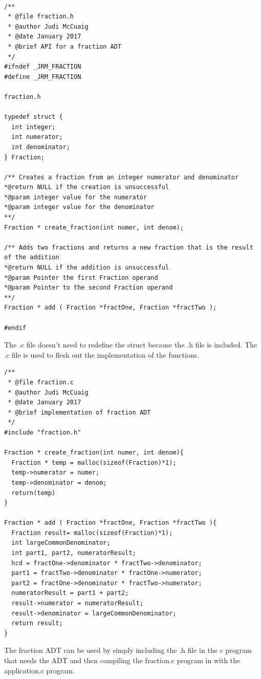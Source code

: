 \begin{lstlisting}

/**
 * @file fraction.h
 * @author Judi McCuaig
 * @date January 2017
 * @brief API for a fraction ADT
 */
#ifndef _JRM_FRACTION
#define _JRM_FRACTION

fraction.h

typedef struct {
  int integer;
  int numerator;
  int denominator;
} Fraction;

/** Creates a fraction from an integer numerator and denominator
*@return NULL if the creation is unsuccessful
*@param integer value for the numerator
*@param integer value for the denominator
**/
Fraction * create_fraction(int numer, int denom);

/** Adds two fractions and returns a new fraction that is the result of the addition
*@return NULL if the addition is unsuccessful
*@param Pointer the first Fraction operand
*@param Pointer to the second Fraction operand
**/
Fraction * add ( Fraction *fractOne, Fraction *fractTwo );

#endif

\end{lstlisting}

The .c file doesn't need to redefine the struct because the .h file is included.  The .c file is used to flesh out the implementation of the functions.

\begin{lstlisting}
/**
 * @file fraction.c
 * @author Judi McCuaig
 * @date January 2017
 * @brief implementation of fraction ADT
 */
#include "fraction.h"

Fraction * create_fraction(int numer, int denom){
  Fraction * temp = malloc(sizeof(Fraction)*1);
  temp->numerator = numer;
  temp->denominator = denom;
  return(temp)
}

Fraction * add ( Fraction *fractOne, Fraction *fractTwo ){
  Fraction result= malloc(sizeof(Fraction)*1);
  int largeCommonDenominator;
  int part1, part2, numeratorResult;
  hcd = fractOne->denominator * fractTwo->denominator;
  part1 = fractTwo->denominator * fractOne->numerator;
  part2 = fractOne->denominator * fractTwo->numerator;
  numeratorResult = part1 + part2;
  result->numerator = numeratorResult;
  result->denominator = largeCommonDenominator;
  return result;
}
\end{lstlisting}

The fraction ADT can be used by simply including the .h file in the c program that needs the ADT and then compiling the fraction.c program in with the application.c program.

